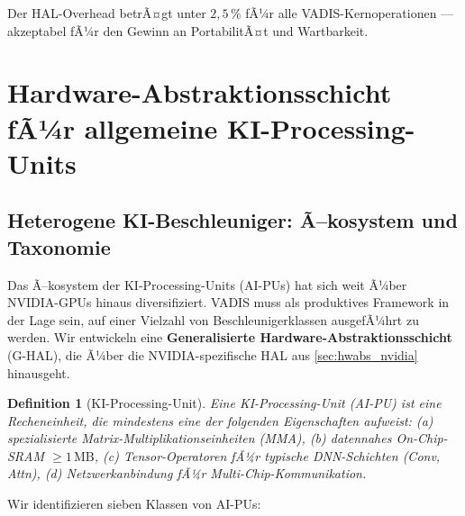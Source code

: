 ﻿\documentclass[12pt,a4paper]{article}
\newtheorem{definition}[theorem]{Definition}
\begin{document}
\noindent Der HAL-Overhead betrÃ¤gt unter $2{,}5\,\%$ fÃ¼r alle
VADIS-Kernoperationen --- akzeptabel fÃ¼r den Gewinn an
PortabilitÃ¤t und Wartbarkeit.

\section{Hardware-Abstraktionsschicht fÃ¼r allgemeine KI-Processing-Units}
\label{sec:hwabs_general}

\subsection{Heterogene KI-Beschleuniger: Ã–kosystem und Taxonomie}
\label{sub:aipu_taxonomy}

Das Ã–kosystem der KI-Processing-Units (AI-PUs) hat sich weit
Ã¼ber NVIDIA-GPUs hinaus diversifiziert. VADIS muss als
produktives Framework in der Lage sein, auf einer Vielzahl
von Beschleunigerklassen ausgefÃ¼hrt zu werden. Wir entwickeln
eine \textbf{Generalisierte Hardware-Abstraktionsschicht}
(G-HAL), die Ã¼ber die NVIDIA-spezifische HAL aus
\cref{sec:hwabs_nvidia} hinausgeht.

\begin{definition}[KI-Processing-Unit]
\label{def:aipu}
Eine \emph{KI-Processing-Unit} (AI-PU) ist eine Recheneinheit,
die mindestens eine der folgenden Eigenschaften aufweist:
(a) spezialisierte Matrix-Multiplikationseinheiten (MMA),
(b) datennahes On-Chip-SRAM $\geq 1\,\text{MB}$,
(c) Tensor-Operatoren fÃ¼r typische DNN-Schichten (Conv, Attn),
(d) Netzwerkanbindung fÃ¼r Multi-Chip-Kommunikation.
\end{definition}

Wir identifizieren sieben Klassen von AI-PUs:
\end{document}
